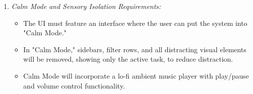 \documentclass[conference]{IEEEtran}
\begin{document}
\begin{enumerate}
\begin{itemize}
    \end{itemize}
    \item \textit{Calm Mode and Sensory Isolation Requirements:}
    \begin{itemize}
        \item The UI must feature an interface where the user can put the system into "Calm Mode."
        \item In "Calm Mode," sidebars, filter rows, and all distracting visual elements will be removed, showing only the active task, to reduce distraction.
        \item Calm Mode will incorporate a lo-fi ambient music player with play/pause and volume control functionality.
    \end{itemize}
\end{enumerate}
\end{document}
